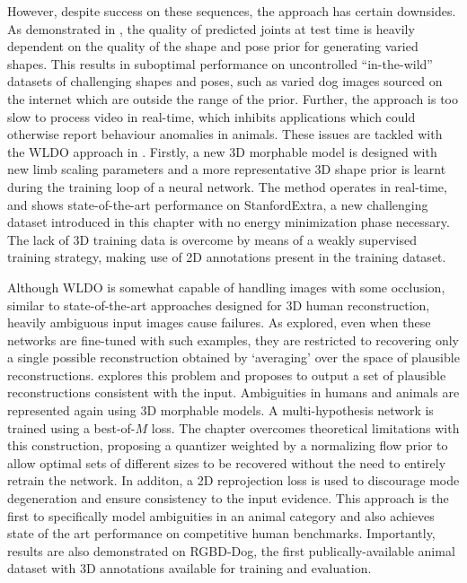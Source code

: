 However, despite success on these sequences, the approach has certain downsides. As demonstrated in , the quality of predicted joints at test time is heavily dependent on the quality of the shape and pose prior for generating varied shapes. This results in suboptimal performance on uncontrolled ``in-the-wild'' datasets of challenging shapes and poses, such as varied dog images sourced on the internet which are outside the range of the prior. Further, the approach is too slow to process video in real-time, which inhibits applications which could otherwise report behaviour anomalies in animals. These issues are tackled with the WLDO approach in . Firstly, a new 3D morphable model is designed with new limb scaling parameters and a more representative 3D shape prior is learnt during the training loop of a neural network. The method operates in real-time, and shows state-of-the-art performance on StanfordExtra, a new challenging dataset introduced in this chapter with no energy minimization phase necessary. The lack of 3D training data is overcome by means of a weakly supervised training strategy, making use of 2D annotations present in the training dataset.

Although WLDO is somewhat capable of handling images with some occlusion, similar to state-of-the-art approaches designed for 3D human reconstruction, heavily ambiguous input images cause failures. As explored, even when these networks are fine-tuned with such examples, they are restricted to recovering only a single possible reconstruction obtained by `averaging' over the space of plausible reconstructions.  explores this problem and proposes to output a set of plausible reconstructions consistent with the input. Ambiguities in humans and animals are represented again using 3D morphable models. A multi-hypothesis network is trained using a best-of-$M$ loss. The chapter overcomes theoretical limitations with this construction, proposing a quantizer weighted by a normalizing flow prior to allow optimal sets of different sizes to be recovered without the need to entirely retrain the network. In additon, a 2D reprojection loss is used to discourage mode degeneration and ensure consistency to the input evidence. This approach is the first to specifically model ambiguities in an animal category and also achieves state of the art performance on competitive human benchmarks. Importantly, results are also demonstrated on RGBD-Dog, the first publically-available animal dataset with 3D annotations available for training and evaluation.

